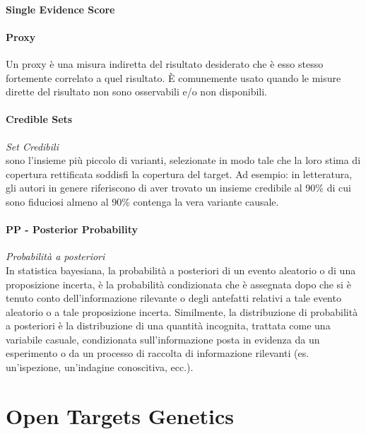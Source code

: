 \documentclass{article}
\begin{document}
\paragraph{Single Evidence Score}
\paragraph{Proxy}Un proxy è una misura indiretta del risultato desiderato che è esso stesso fortemente correlato a quel risultato. È comunemente usato quando le misure dirette del risultato non sono osservabili e/o non disponibili.
\paragraph{Credible Sets}\textit{Set Credibili}\\sono l'insieme più piccolo di varianti, selezionate in modo tale che la loro stima di copertura rettificata soddisfi la copertura del target. Ad esempio: in letteratura, gli autori in genere riferiscono di aver trovato un insieme credibile al 90\% di cui sono fiduciosi almeno al 90\% contenga la vera variante causale.
\paragraph{PP - Posterior Probability}\textit{Probabilità a posteriori}\\In statistica bayesiana, la probabilità a posteriori di un evento aleatorio o di una proposizione incerta, è la probabilità condizionata che è assegnata dopo che si è tenuto conto dell'informazione rilevante o degli antefatti relativi a tale evento aleatorio o a tale proposizione incerta. Similmente, la distribuzione di probabilità a posteriori è la distribuzione di una quantità incognita, trattata come una variabile casuale, condizionata sull'informazione posta in evidenza da un esperimento o da un processo di raccolta di informazione rilevanti (es. un'ispezione, un'indagine conoscitiva, ecc.).
\section{Open Targets Genetics}
\end{document}
